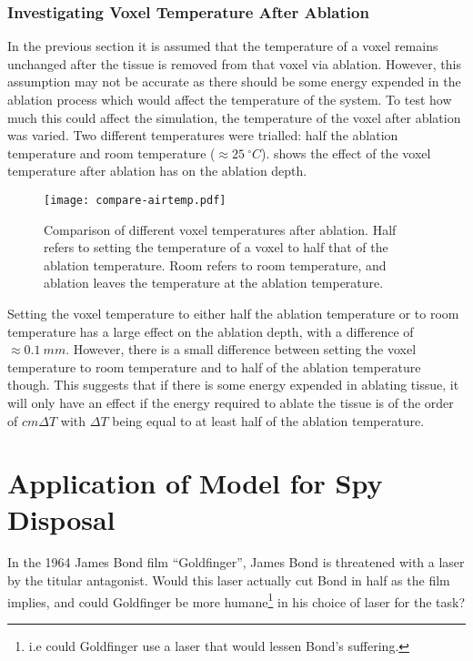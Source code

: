 \subsubsection*{Investigating Voxel Temperature After Ablation}

In the previous section it is assumed that the temperature of a voxel remains unchanged after the tissue is removed from that voxel via ablation.
However, this assumption may not be accurate as there should be some energy expended in the ablation process which would affect the temperature of the system.
To test how much this could affect the simulation, the temperature of the voxel after ablation was varied.
Two different temperatures were trialled: half the ablation temperature and room temperature ($\approx 25~^{\circ}C$).
 shows the effect of the voxel temperature after ablation has on the ablation depth.

\begin{figure}[!htbp]
	\centering
	\texttt{[image: compare-airtemp.pdf]}
	\caption{Comparison of different voxel temperatures after ablation. Half refers to setting the temperature of a voxel to half that of the ablation temperature. Room refers to room temperature, and ablation leaves the temperature at the ablation temperature.}
	\label{fig:comparevoxtemp}
\end{figure}

Setting the voxel temperature to either half the ablation temperature or to room temperature has a large effect on the ablation depth, with a difference of $\approx 0.1~mm$.
However, there is a small difference between setting the voxel temperature to room temperature and to half of the ablation temperature though.
This suggests that if there is some energy expended in ablating tissue, it will only have an effect if the energy required to ablate the tissue is of the order of $cm\Delta T$ with $\Delta T$ being equal to at least half of the ablation temperature.

\section{Application of Model for Spy Disposal}

In the 1964 James Bond film ``Goldfinger'', James Bond is threatened with a laser by the titular antagonist.
Would this laser actually cut Bond in half as the film implies, and could Goldfinger be more humane\footnote{i.e could Goldfinger use a laser that would lessen Bond's suffering.} in his choice of laser for the task?

